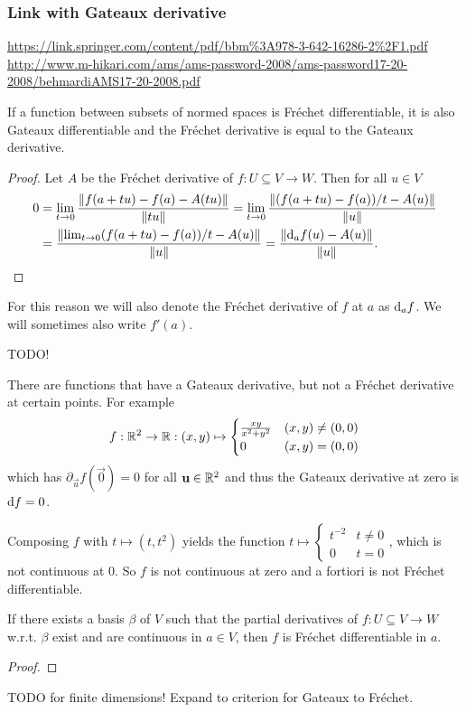 \subsubsection{Link with Gateaux derivative}
\url{https://link.springer.com/content/pdf/bbm%3A978-3-642-16286-2%2F1.pdf}
\url{http://www.m-hikari.com/ams/ams-password-2008/ams-password17-20-2008/behmardiAMS17-20-2008.pdf}
\begin{proposition}
If a function between subsets of normed spaces is Fréchet differentiable, it is also Gateaux differentiable and the Fréchet derivative is equal to the Gateaux derivative.
\end{proposition}
\begin{proof}
Let $A$ be the Fréchet derivative of $f: U\subseteq V\to W$. Then for all $u\in V$
\begin{align*}
0 &= \lim_{t\to 0} \frac{\lVert f(a+tu) - f(a) - A(tu)\rVert}{\lVert tu\rVert} = \lim_{t\to 0} \frac{\lVert(f(a+tu) - f(a))/t - A(u)\rVert}{\lVert u\rVert} \\
&= \frac{\lVert\lim_{t\to 0}(f(a+tu) - f(a))/t - A(u)\rVert}{\lVert u\rVert} = \frac{\lVert\operatorname{d \!}{_af}(u) - A(u)\rVert}{\lVert u\rVert}. 
\end{align*}
\end{proof}
For this reason we will also denote the Fréchet derivative of $f$ at $a$ as $\operatorname{d \!}{_a f}$. We will sometimes also write $f'(a)$.

\begin{example}
TODO!

There are functions that have a Gateaux derivative, but not a Fréchet derivative at certain points. For example
\[ f: \mathbb{R}^2\to \mathbb{R}: (x,y) \mapsto \begin{cases}
\frac{xy}{x^2+y^2} & (x,y)\neq (0,0) \\0 & (x,y) = (0,0)
\end{cases} \]
which has $\partial_{\vec{u}}f(\vec{0}) = 0$ for all $\boldsymbol{\mathrm{u}}\in \mathbb{R}^2$ and thus the Gateaux derivative at zero is $\operatorname{d \!}{f} = 0$.

Composing $f$ with $t\mapsto (t,t^2)$ yields the function $t\mapsto \begin{cases}
t^{-2} & t\neq 0 \\ 0 & t=0
\end{cases}$, which is not continuous at $0$. So $f$ is not continuous at zero and a fortiori is not Fréchet differentiable.
\end{example}

\begin{proposition}
If there exists a basis $\beta$ of $V$ such that the partial derivatives of $f:U\subseteq V\to W$ w.r.t. $\beta$ exist and are continuous in $a\in V$, then $f$ is Fréchet differentiable in $a$.
\end{proposition}
\begin{proof}

\end{proof}
TODO for finite dimensions! Expand to criterion for Gateaux to Fréchet.
\begin{example}

\end{example}

